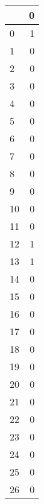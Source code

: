 \begin{tabular}{lr}
\toprule
{} &  0 \\
\midrule
0  &  1 \\
1  &  0 \\
2  &  0 \\
3  &  0 \\
4  &  0 \\
5  &  0 \\
6  &  0 \\
7  &  0 \\
8  &  0 \\
9  &  0 \\
10 &  0 \\
11 &  0 \\
12 &  1 \\
13 &  1 \\
14 &  0 \\
15 &  0 \\
16 &  0 \\
17 &  0 \\
18 &  0 \\
19 &  0 \\
20 &  0 \\
21 &  0 \\
22 &  0 \\
23 &  0 \\
24 &  0 \\
25 &  0 \\
26 &  0 \\
\bottomrule
\end{tabular}
